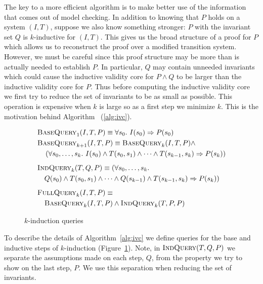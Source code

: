The key to a more efficient algorithm is to make better use of the
information that comes out of model checking. In addition to knowing
that $P$ holds on a system $(I, T)$, suppose we also know something
stronger: $P$ with the invariant set $Q$ is $k$-inductive for $(I,
T)$. This gives us the broad structure of a proof for $P$ which allows
us to reconstruct the proof over a modified transition system.
However, we must be careful since this proof structure may be more
than is actually needed to establish $P$. In particular, $Q$ may
contain unneeded invariants which could cause the inductive validity
core for $P \land Q$ to be larger than the inductive validity core for
$P$. Thus before computing the inductive validity core we first try to
reduce the set of invariants to be as small as possible. This
operation is expensive when $k$ is large so as a first step we
minimize $k$. This is the motivation behind
Algorithm \ucalg~(\ref{alg:ivc}).

\begin{figure}
\begin{align*}
  &\bq_1(I, T, P) \equiv \forall s_0.~ I(s_0) \Rightarrow P(s_0) \\
  &\bq_{k+1}(I, T, P) \equiv \bq_k(I, T, P) \land~ \\
%
  &\hspace{10pt}\left(\forall s_0, \ldots, s_k.~ I(s_0) \land T(s_0,
  s_1) \land \cdots \land T(s_{k-1}, s_k) \Rightarrow P(s_k)\right)
  \\[5pt]
  &\iq_k(T, Q, P) \equiv (\forall s_0, \ldots, s_k.~\\
%
  &\hspace{10pt} Q(s_0) \land T(s_0,
  s_1) \land \cdots \land Q(s_{k-1}) \land T(s_{k-1}, s_k) \Rightarrow
  P(s_k)) \\[5pt]
  &\fq_k(I, T, P) \equiv \\
%
  &\hspace{10pt}\bq_k(I, T, P) \land \iq_k(T, P, P)
\end{align*}
\caption{$k$-induction queries}
\label{fig:queries}
\end{figure}

To describe the details of Algorithm~\ref{alg:ivc} we define queries
for the base and inductive steps of $k$-induction
(Figure~\ref{fig:queries}). Note, in $\textsc{IndQuery}(T, Q, P)$ we separate the
assumptions made on each step, $Q$, from the property we try to show
on the last step, $P$. We use this separation when reducing the set of
invariants.

